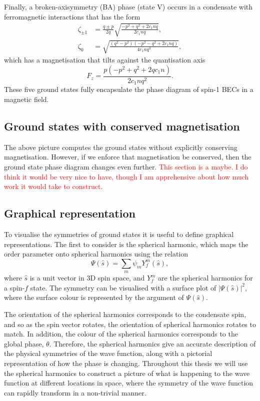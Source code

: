 Finally, a broken-axisymmetry (BA) phase (state V) occurs in a condensate with
ferromagnetic interactions that has the form
\begin{equation}
    \begin{aligned}
        \zeta_{\pm 1} & =
        \frac{q \pm p}{2q}\sqrt{\frac{-p^2+q^2+2c_1nq}{2c_1nq}},              \\
        \zeta_0       & = \sqrt{\frac{(q^2-p^2)(-p^2-q^2+2c_1nq)}{4c_1nq^3}},
    \end{aligned}
    \label{eq: BA-spinor}
\end{equation}
which has a magnetisation that tilts against the quantisation axis
\begin{equation}
    F_z = \frac{p(-p^2 + q^2 + 2qc_1n)}{2c_1nq^2}.
\end{equation}
These five ground states fully encapsulate the phase diagram of spin-1 BECs
in a magnetic field.

\subsection{Ground states with conserved magnetisation}
The above picture computes the ground states without explicitly conserving
magnetisation.
However, if we enforce that magnetisation be conserved, then the ground state
phase diagram changes even further.
\textcolor{red}{This section is a maybe.
    I do think it would be very
    nice to have, though I am apprehensive about how much work it would take to
    construct.}


\subsection{Graphical representation}
To visualise the symmetries of ground states it is useful to define graphical
representations.
The first to consider is the spherical harmonic, which maps the order parameter
onto spherical harmonics using the relation
\begin{equation}
    \Psi(\hat{s}) = \sum_m\psi_m Y_f^m(\hat{s}),
    \label{eq: spherical-harmonics}
\end{equation}
where \(\hat{s}\) is a unit vector in 3D spin space, and \(Y_f^m \) are the
spherical harmonics for a spin-\(f\) state.
The symmetry can be visualised with a surface plot of \(|\Psi(\hat{s})|^2\),
where the surface colour is represented by the argument of \(\Psi(\hat{s})\).

The orientation of the spherical harmonics corresponds to the condensate spin,
and so as the spin vector rotates, the orientation of spherical harmonics
rotates to match.
In addition, the colour of the spherical harmonics corresponds to the global
phase, \( \theta \).
Therefore, the spherical harmonics give an accurate description of the
physical symmetries of the wave function, along with a pictorial representation
of how the phase is changing.
Throughout this thesis we will use the spherical harmonics to construct a
picture of what is happening to the wave function at different locations in
space, where the symmetry of the wave function can rapidly transform in a
non-trivial manner.

